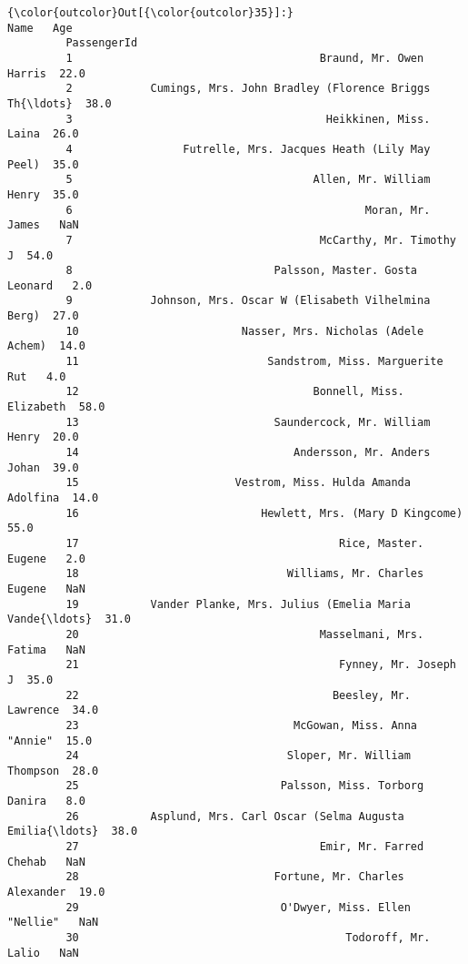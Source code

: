 \documentclass[11pt]{article}
\begin{document}
\begin{Verbatim}[commandchars=\\\{\}]
{\color{outcolor}Out[{\color{outcolor}35}]:}                                                           Name   Age
         PassengerId                                                         
         1                                      Braund, Mr. Owen Harris  22.0
         2            Cumings, Mrs. John Bradley (Florence Briggs Th{\ldots}  38.0
         3                                       Heikkinen, Miss. Laina  26.0
         4                 Futrelle, Mrs. Jacques Heath (Lily May Peel)  35.0
         5                                     Allen, Mr. William Henry  35.0
         6                                             Moran, Mr. James   NaN
         7                                      McCarthy, Mr. Timothy J  54.0
         8                               Palsson, Master. Gosta Leonard   2.0
         9            Johnson, Mrs. Oscar W (Elisabeth Vilhelmina Berg)  27.0
         10                         Nasser, Mrs. Nicholas (Adele Achem)  14.0
         11                             Sandstrom, Miss. Marguerite Rut   4.0
         12                                    Bonnell, Miss. Elizabeth  58.0
         13                              Saundercock, Mr. William Henry  20.0
         14                                 Andersson, Mr. Anders Johan  39.0
         15                        Vestrom, Miss. Hulda Amanda Adolfina  14.0
         16                            Hewlett, Mrs. (Mary D Kingcome)   55.0
         17                                        Rice, Master. Eugene   2.0
         18                                Williams, Mr. Charles Eugene   NaN
         19           Vander Planke, Mrs. Julius (Emelia Maria Vande{\ldots}  31.0
         20                                     Masselmani, Mrs. Fatima   NaN
         21                                        Fynney, Mr. Joseph J  35.0
         22                                       Beesley, Mr. Lawrence  34.0
         23                                 McGowan, Miss. Anna "Annie"  15.0
         24                                Sloper, Mr. William Thompson  28.0
         25                               Palsson, Miss. Torborg Danira   8.0
         26           Asplund, Mrs. Carl Oscar (Selma Augusta Emilia{\ldots}  38.0
         27                                     Emir, Mr. Farred Chehab   NaN
         28                              Fortune, Mr. Charles Alexander  19.0
         29                               O'Dwyer, Miss. Ellen "Nellie"   NaN
         30                                         Todoroff, Mr. Lalio   NaN

\end{Verbatim}
\end{document}
